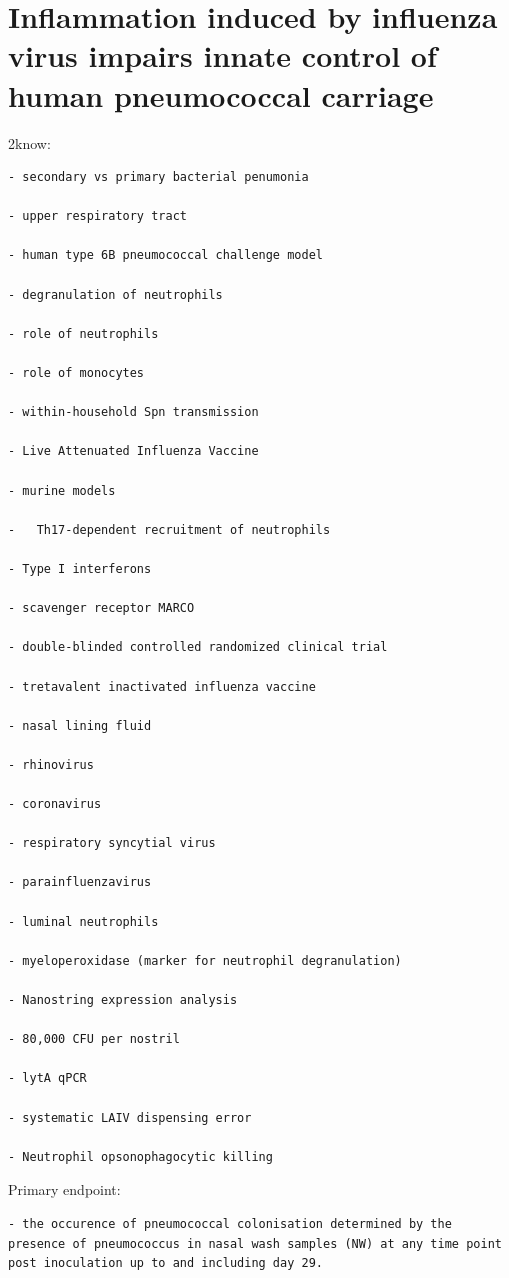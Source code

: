\documentclass[
]{book}
\begin{document}
\hypertarget{inflammation-induced-by-influenza-virus-impairs-innate-control-of-human-pneumococcal-carriage}{%
\section{Inflammation induced by influenza virus impairs innate control of human pneumococcal carriage}\label{inflammation-induced-by-influenza-virus-impairs-innate-control-of-human-pneumococcal-carriage}}

2know:

\begin{verbatim}
- secondary vs primary bacterial penumonia

- upper respiratory tract

- human type 6B pneumococcal challenge model

- degranulation of neutrophils

- role of neutrophils

- role of monocytes

- within-household Spn transmission

- Live Attenuated Influenza Vaccine

- murine models

-   Th17-dependent recruitment of neutrophils

- Type I interferons

- scavenger receptor MARCO

- double-blinded controlled randomized clinical trial

- tretavalent inactivated influenza vaccine

- nasal lining fluid

- rhinovirus

- coronavirus

- respiratory syncytial virus

- parainfluenzavirus

- luminal neutrophils

- myeloperoxidase (marker for neutrophil degranulation)

- Nanostring expression analysis

- 80,000 CFU per nostril

- lytA qPCR

- systematic LAIV dispensing error

- Neutrophil opsonophagocytic killing
\end{verbatim}

Primary endpoint:

\begin{verbatim}
- the occurence of pneumococcal colonisation determined by the presence of pneumococcus in nasal wash samples (NW) at any time point post inoculation up to and including day 29.
\end{verbatim}
\end{document}
